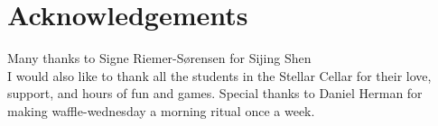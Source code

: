 \section{Acknowledgements}

Many thanks to Signe Riemer-S{\o}rensen for  Sijing Shen  \\
I would also like to thank all the students in the Stellar Cellar for their love, support, and hours of fun and games.
Special thanks to Daniel Herman for making waffle-wednesday a morning ritual once a week.
